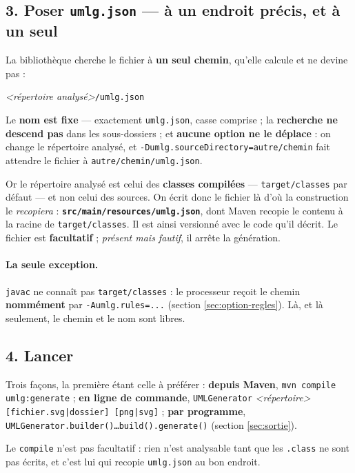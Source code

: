 \documentclass[12pt, a4paper]{article}
\newcommand{\meta}[1]{\textnormal{\textit{<#1>}}}
\begin{document}
\subsection{3. Poser \texttt{umlg.json} --- à un endroit précis, et à un seul}
\label{sec:ou-regles}

La bibliothèque cherche le fichier à \textbf{un seul chemin}, qu'elle calcule et ne devine pas :

\begin{center}
\meta{répertoire analysé}\texttt{/umlg.json}
\end{center}

Le \textbf{nom est fixe} --- exactement \texttt{umlg.json}, casse comprise ; la \textbf{recherche ne descend pas} dans les sous-dossiers ; et \textbf{aucune option ne le déplace} : on change le répertoire analysé, et \texttt{-Dumlg.sourceDirectory=autre/chemin} fait attendre le fichier à \texttt{autre/chemin/umlg.json}.

Or le répertoire analysé est celui des \textbf{classes compilées} --- \texttt{target/classes} par défaut --- et non celui des sources. On écrit donc le fichier là d'où la construction le \textit{recopiera} : \textbf{\texttt{src/main/resources/umlg.json}}, dont Maven recopie le contenu à la racine de \texttt{target/classes}. Il est ainsi versionné avec le code qu'il décrit. Le fichier est \textbf{facultatif} ; \textit{présent mais fautif}, il arrête la génération.

\paragraph{La seule exception.} \texttt{javac} ne connaît pas \texttt{target/classes} : le processeur reçoit le chemin \textbf{nommément} par \texttt{-Aumlg.rules=...} (section \ref{sec:option-regles}). Là, et là seulement, le chemin et le nom sont libres.

\subsection{4. Lancer}
Trois façons, la première étant celle à préférer : \textbf{depuis Maven}, \texttt{mvn compile umlg:generate} ; \textbf{en ligne de commande}, \texttt{UMLGenerator} \meta{répertoire} \texttt{[fichier.svg|dossier] [png|svg]} ; \textbf{par programme}, \texttt{UMLGenerator.builder()\ldots build().generate()} (section \ref{sec:sortie}).

Le \texttt{compile} n'est pas facultatif : rien n'est analysable tant que les \texttt{.class} ne sont pas écrits, et c'est lui qui recopie \texttt{umlg.json} au bon endroit.
\end{document}

